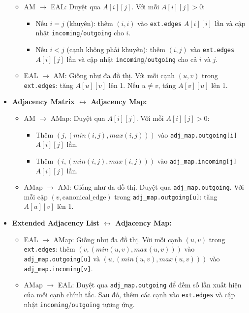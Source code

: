 \documentclass{article}
\begin{document}
\begin{itemize}
    \begin{itemize}
        \item AM $\to$ EAL: Duyệt qua $A[i][j]$. Với mỗi $A[i][j] > 0$:
        \begin{itemize}
            \item Nếu $i = j$ (khuyên): thêm $(i,i)$ vào \texttt{ext.edges} $A[i][i]$ lần và cập nhật \texttt{incoming}/\texttt{outgoing} cho $i$.
            \item Nếu $i < j$ (cạnh không phải khuyên): thêm $(i,j)$ vào \texttt{ext.edges} $A[i][j]$ lần và cập nhật \texttt{incoming}/\texttt{outgoing} cho cả $i$ và $j$.
        \end{itemize}
        \item EAL $\to$ AM: Giống như đa đồ thị. Với mỗi cạnh $(u,v)$ trong \texttt{ext.edges}: tăng $A[u][v]$ lên 1. Nếu $u \neq v$, tăng $A[v][u]$ lên 1.
    \end{itemize}
    \item \textbf{Adjacency Matrix $\leftrightarrow$ Adjacency Map:}
    \begin{itemize}
        \item AM $\to$ AMap: Duyệt qua $A[i][j]$. Với mỗi $A[i][j] > 0$:
        \begin{itemize}
            \item Thêm $(j, (min(i,j), max(i,j)))$ vào \texttt{adj\_map.outgoing[i]} $A[i][j]$ lần.
            \item Thêm $(i, (min(i,j), max(i,j)))$ vào \texttt{adj\_map.incoming[j]} $A[i][j]$ lần.
        \end{itemize}
        \item AMap $\to$ AM: Giống như đa đồ thị. Duyệt qua \texttt{adj\_map.outgoing}. Với mỗi cặp $(v, \text{canonical\_edge})$ trong \texttt{adj\_map.outgoing[u]}: tăng $A[u][v]$ lên 1.
    \end{itemize}
    \item \textbf{Extended Adjacency List $\leftrightarrow$ Adjacency Map:}
    \begin{itemize}
        \item EAL $\to$ AMap: Giống như đa đồ thị. Với mỗi cạnh $(u,v)$ trong \texttt{ext.edges}: thêm $(v, (min(u,v), max(u,v)))$ vào \texttt{adj\_map.outgoing[u]} và $(u, (min(u,v), max(u,v)))$ vào \texttt{adj\_map.incoming[v]}.
        \item AMap $\to$ EAL: Duyệt qua \texttt{adj\_map.outgoing} để đếm số lần xuất hiện của mỗi cạnh chính tắc. Sau đó, thêm các cạnh vào \texttt{ext.edges} và cập nhật \texttt{incoming}/\texttt{outgoing} tương ứng.
    \end{itemize}
\end{itemize}
\end{document}
